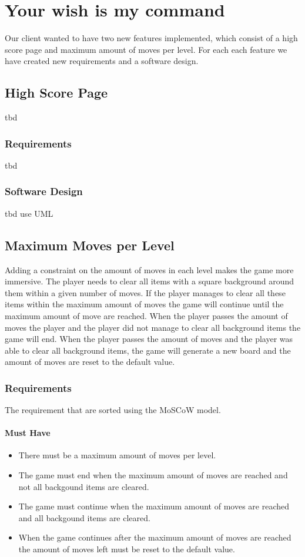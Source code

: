 \documentclass{article}
\begin{document}
\newpage
\section{Your wish is my command}
Our client wanted to have two new features implemented, which consist of a high score page and maximum amount of moves per level. For each each feature we have created new requirements and a software design.

\subsection{High Score Page}
tbd

\subsubsection{Requirements}
tbd

\subsubsection{Software Design}
tbd {use UML}

\subsection{Maximum Moves per Level}
Adding a constraint on the amount of moves in each level makes the game more immersive. The player needs to clear all items with a square background around them within a given number of moves. If the player manages to clear all these items within the maximum amount of moves the game will continue until the maximum amount of move are reached. When the player passes the amount of moves the player and the player did not manage to clear all background items the game will end. When the player passes the amount of moves and the player was able to clear all background items, the game will generate a new board and the amount of moves are reset to the default value. 

\subsubsection{Requirements}
The requirement that are sorted using the MoSCoW model.

\paragraph{Must Have}
\begin{itemize}
	\item There must be a maximum amount of moves per level.
	\item The game must end when the maximum amount of moves are reached and not all backgound items are cleared.
	\item The game must continue when the maximum amount of moves are reached and all backgound items are cleared.
	\item When the game continues after the maximum amount of moves are reached the amount of moves left must be reset to the default value.
\end{itemize}
\end{document}
